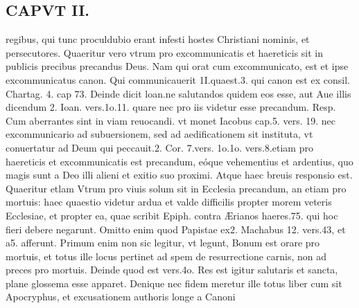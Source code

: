 \documentclass{article}
\begin{document}
\begin{pages}
\section*{CAPVT  II. }
\marginpar{[ p.45 ]}\pstart regibus, qui tunc proculdubio erant infesti hostes Christiani nominis, et persecutores. Quaeritur vero vtrum pro excommunicatis et haereticis sit in publicis precibus precandus Deus. Nam qui orat cum excommunicato, est et ipse excommunicatus canon. Qui communicauerit 1I.quaest.3. qui canon est ex consil. Chartag. 4. cap 73. Deinde dicit loan.ne salutandos quidem eos esse, aut Aue illis dicendum 2. Ioan. vers.1o.11. quare nec pro iis videtur esse precandum. Resp. Cum aberrantes sint in viam reuocandi. vt monet Iacobus cap.5. vers. 19. nec excommunicario ad subuersionem, sed ad aedificationem sit instituta, vt conuertatur ad Deum qui peccauit.2. Cor. 7.vers. 1o.1o. vers.8.etiam pro haereticis et excommunicatis est precandum, eóque vehementius et ardentius, quo magis sunt a Deo illi alieni et exitio suo proximi. Atque haec breuis responsio est. Quaeritur etlam Vtrum pro viuis solum sit in Ecclesia precandum, an etiam pro mortuis: haec quaestio videtur ardua et valde difficilis propter morem veteris Ecclesiae, et propter ea, quae scribit Epiph. contra Ærianos haeres.75. qui hoc fieri debere negarunt. Omitto enim quod Papistae ex2. Machabus  12. vers.43, et a5. afferunt. Primum enim non sic legitur, vt legunt, Bonum est orare pro mortuis, et totus ille locus pertinet ad spem de resurrectione carnis, non ad preces pro mortuis. Deinde quod est vers.4o. Res est igitur salutaris et sancta, plane glossema esse apparet. Denique nec fidem meretur ille totus liber cum sit Apocryphus, et excusationem authoris longe a Canoni\pend

\end{pages}
\end{document}

